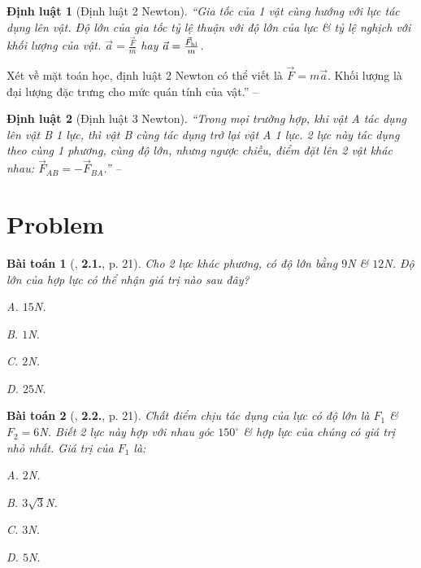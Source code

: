 \documentclass{article}
\numberwithin{equation}{section}
\newtheorem{dinhluat}{Định luật}[section]
\newtheorem{baitoan}{Bài toán}[section]
\begin{document}
\begin{dinhluat}[Định luật 2 Newton]
	``Gia tốc của 1 vật cùng hướng với lực tác dụng lên vật. Độ lớn của gia tốc tỷ lệ thuận với độ lớn của lực \& tỷ lệ nghịch với khối lượng của vật. $\vec{a} = \frac{\vec{F}}{m}$ hay $\vec{a} = \frac{\vec{F}_{\rm hl}}{m}$.
\end{dinhluat}
Xét về mặt toán học, định luật 2 Newton có thể viết là $\vec{F} = m\vec{a}$. Khối lượng là đại lượng đặc trưng cho mức quán tính của vật.'' -- \cite[p. 19]{Giang_Hang_Trung2022}

\begin{dinhluat}[Định luật 3 Newton]
	``Trong mọi trường hợp, khi vật A tác dụng lên vật B 1 lực, thì vật B cùng tác dụng trở lại vật A 1 lực. 2 lực này tác dụng theo cùng 1 phương, cùng độ lớn, nhưng ngược chiều, điểm đặt lên 2 vật khác nhau: $\vec{F}_{AB} = -\vec{F}_{BA}$.'' -- \cite[p. 20]{Giang_Hang_Trung2022}
\end{dinhluat}

\section{Problem}

\begin{baitoan}[\cite{Giang_Hang_Trung2022}, \textbf{2.1.}, p. 21]
	Cho 2 lực khác phương, có độ lớn bằng $9$\emph{N} \& $12$\emph{N}. Độ lớn của hợp lực có thể nhận giá trị nào sau đây?
	\begin{enumerate*}
		\item[{\rm\sf A.}] $15$\emph{N}.
		\item[{\rm\sf B.}] $1$\emph{N}.
		\item[{\rm\sf C.}] $2$\emph{N}.
		\item[{\rm\sf D.}] $25$\emph{N}.
	\end{enumerate*}
\end{baitoan}

\begin{baitoan}[\cite{Giang_Hang_Trung2022}, \textbf{2.2.}, p. 21]
	Chất điểm chịu tác dụng của lực có độ lớn là $F_1$ \& $F_2 = 6$\emph{N}. Biết 2 lực này hợp với nhau góc $150^\circ$ \& hợp lực của chúng có giá trị nhỏ nhất. Giá trị của $F_1$ là: 
	\begin{enumerate*}
		\item[{\rm\sf A.}] $2$\emph{N}.
		\item[{\rm\sf B.}] $3\sqrt{3}$\emph{N}.
		\item[{\rm\sf C.}] $3$\emph{N}.
		\item[{\rm\sf D.}] $5$\emph{N}.
	\end{enumerate*}
\end{baitoan}


\printbibliography[heading=bibintoc]
	
\end{document}
